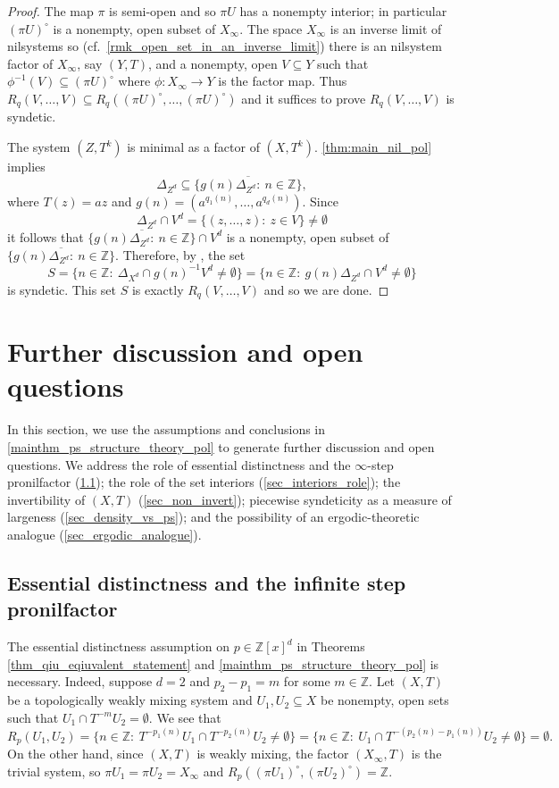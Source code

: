 \documentclass{article}
\theoremstyle{plain}
\theoremstyle{claim}
\theoremstyle{definition}
\theoremstyle{plain}
\theoremstyle{plain}
\newcommand{\Z}{\mathbb{Z}}
\newcommand{\1}{\boldsymbol{1}}
\begin{document}
\begin{proof}
The map $\pi$ is semi-open and so $\pi U$ has a nonempty interior; in particular $(\pi U)^\circ$ is a nonempty, open subset of $X_{\infty}$. The space $X_{\infty}$ is an inverse limit of nilsystems so (cf.\ \cref{rmk_open_set_in_an_inverse_limit}) there is an nilsystem factor of $X_{\infty}$, say $(Y, T)$, and a nonempty, open $V \subseteq Y$ such that $\phi^{-1}(V) \subseteq (\pi U)^\circ$ where $\phi: X_{\infty} \to Y$ is the factor map.
Thus $R_q(V, \ldots, V) \subseteq R_q((\pi U)^\circ, \ldots, (\pi U)^\circ)$ and it suffices to prove $R_q(V, \ldots, V)$ is syndetic.

The system $(Z,T^k)$ is minimal as a factor of $(X,T^k)$.
\cref{thm:main_nil_pol} implies
\[
\Delta_{Z^d} \subseteq \overline{\{g(n) \Delta_{Z^d}: \ n \in \Z\}},
\]
where  $T(z) = az$ and $g(n) = (a^{q_1(n)},\dots,a^{q_d(n)})$.
Since
\[
\Delta_{Z^d} \cap V^d = \{(z, \ldots, z): \ z \in V\} \neq \emptyset
\]
it follows that $\overline{\{g(n) \Delta_{Z^d}: \ n \in \Z\}} \cap V^d$ is a nonempty, open subset of $\overline{\{g(n) \Delta_{Z^d}: \ n \in \Z\}}$. Therefore, by \cite[Corollary 1.9]{Leibman05b}, the set
\[
    S = \{n \in \Z: \ \Delta_{X^d} \cap g(n)^{-1} V^d \neq \emptyset\} = \{n \in \Z: \ g(n) \Delta_{Z^d} \cap V^d \neq \emptyset\} 
\]
is syndetic. This set $S$ is exactly $R_q(V, \ldots, V)$ and so we are done.
\end{proof}

\section{Further discussion and open questions}
\label{sec_further}

In this section, we use the assumptions and conclusions in \cref{mainthm_ps_structure_theory_pol} to generate further discussion and open questions.  We address the role of essential distinctness and the $\infty$-step pronilfactor (\cref{sec_equicont_factor}); the role of the set interiors (\cref{sec_interiors_role}); the invertibility of $(X,T)$ (\cref{sec_non_invert}); piecewise syndeticity as a measure of largeness (\cref{sec_density_vs_ps}); and the possibility of an ergodic-theoretic analogue (\cref{sec_ergodic_analogue}). 


\subsection{Essential distinctness and the infinite step pronilfactor}
\label{sec_equicont_factor}

The essential distinctness assumption on $p \in \Z[x]^d$ in Theorems \ref{thm_qiu_eqiuvalent_statement} and \ref{mainthm_ps_structure_theory_pol} is necessary. Indeed, suppose $d=2$ and $p_2 - p_1 = m$ for some $m\in\Z$. Let $(X, T)$ be a topologically weakly mixing system and $U_1, U_2 \subseteq X$ be nonempty, open sets such that $U_1 \cap T^{-m} U_2 = \emptyset$. We see that
\[
    R_p(U_1, U_2) = \{n \in \Z: \ T^{-p_1(n)} U_1 \cap T^{-p_2(n)} U_2 \neq \emptyset\} = \{n \in \Z: \ U_1 \cap T^{-(p_2(n) - p_1(n))} U_2 \neq \emptyset\} = \emptyset.
\]
On the other hand, since $(X,T)$ is weakly mixing, the factor $(X_{\infty},T)$ is the trivial system, so $\pi U_1=\pi U_2=X_\infty$ and $R_p((\pi U_1)^{\circ}, \allowbreak (\pi U_2)^{\circ}) = \Z$.
\end{document}
